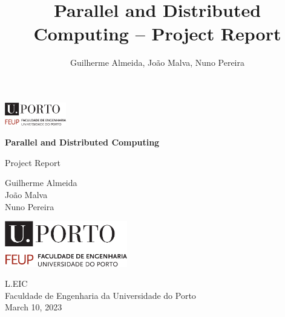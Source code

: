 \documentclass[11pt,a4paper]{article}
\title{Parallel and Distributed Computing -- \nth{1} Project Report}
\author{Guilherme Almeida, João Malva, Nuno Pereira}
\begin{document}

\begin{titlepage}
    \begin{flushleft}
        \includegraphics[width=0.2\textwidth]{resources/uporto-feup.pdf}
    \end{flushleft}
   \begin{center}
       \vspace*{2cm}

       \begin{Huge}
            \textbf{Parallel and Distributed Computing}
       \end{Huge}

       \vspace{0.5cm}

       \begin{Large}
         Project Report
       \end{Large}
       \vspace{1cm}

        \begin{center}
                Guilherme Almeida\\
                João Malva\\
                Nuno Pereira\\
        \end{center}


            
       \vspace{3cm}
     
       \includegraphics[width=0.4\textwidth]{resources/uporto-feup.pdf}

       \vfill{}
            
       L.EIC\\
       Faculdade de Engenharia da Universidade do Porto\\
       March 10, 2023
            
   \end{center}
\end{titlepage}
\end{document}
